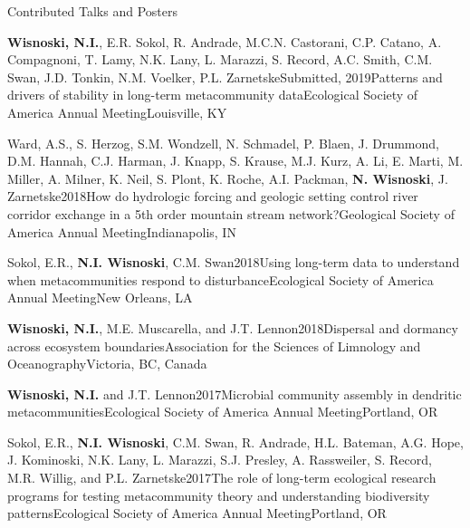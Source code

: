 \documentclass{resume} %
\begin{document}
\begin{rhangSection}{Contributed Talks and Posters}
  
    \begin{Presentation}{{\bf Wisnoski, N.I.}, E.R. Sokol, R. Andrade, M.C.N. Castorani, C.P. Catano, A. Compagnoni, T. Lamy, N.K. Lany, L. Marazzi, S. Record, A.C. Smith, C.M. Swan, J.D. Tonkin, N.M. Voelker, P.L. Zarnetske}{Submitted, 2019}{Patterns and drivers of stability in long-term metacommunity data}{Ecological Society of America Annual Meeting}{Louisville, KY}
  \end{Presentation}
  
  \begin{Presentation}{Ward, A.S., S. Herzog, S.M. Wondzell, N. Schmadel, P. Blaen, J. Drummond, D.M. Hannah, C.J. Harman, J. Knapp, S. Krause, M.J. Kurz, A. Li, E. Marti, M. Miller, A. Milner, K. Neil, S. Plont, K. Roche, A.I. Packman, {\bf N. Wisnoski}, J. Zarnetske}{2018}{How do hydrologic forcing and geologic setting control river corridor exchange in a 5th order mountain stream network?}{Geological Society of America Annual Meeting}{Indianapolis, IN}
  \end{Presentation}
  
  \begin{Presentation}{Sokol, E.R., {\bf N.I. Wisnoski}, C.M. Swan}{2018}{Using long-term data to understand when metacommunities respond to disturbance}{Ecological Society of America Annual Meeting}{New Orleans, LA}
  \end{Presentation}

  \begin{Presentation}{{\bf Wisnoski, N.I.}, M.E. Muscarella, and J.T. Lennon}{2018}{Dispersal and dormancy across ecosystem boundaries}{Association for the Sciences of Limnology and Oceanography}{Victoria, BC, Canada}
  \end{Presentation}

  \begin{Presentation}{{\bf Wisnoski, N.I.} and J.T. Lennon}{2017}{Microbial community assembly in dendritic metacommunities}{Ecological Society of America Annual Meeting}{Portland, OR}
  \end{Presentation}
  
  \begin{Presentation}{Sokol, E.R., {\bf N.I. Wisnoski}, C.M. Swan, R. Andrade, H.L. Bateman, A.G. Hope, J. Kominoski, N.K. Lany, L. Marazzi, S.J. Presley, A. Rassweiler, S. Record, M.R. Willig, and P.L.
Zarnetske}{2017}{The role of long-term ecological research programs for testing
metacommunity theory and understanding biodiversity patterns}{Ecological Society of
America Annual Meeting}{Portland, OR}
  \end{Presentation}
  

\end{rhangSection}
\end{document}
